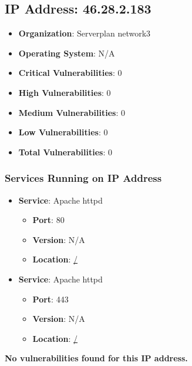 \documentclass{article}
\begin{document}
\clearpage



\subsection{IP Address: 46.28.2.183}

\begin{itemize}
    \item \textbf{Organization}: Serverplan network3
    \item \textbf{Operating System}:  N/A 
    \item \textbf{Critical Vulnerabilities}: 0
    \item \textbf{High Vulnerabilities}: 0
    \item \textbf{Medium Vulnerabilities}: 0
    \item \textbf{Low Vulnerabilities}: 0
    \item \textbf{Total Vulnerabilities}: 0
\end{itemize}

\subsubsection*{Services Running on IP Address}

\begin{itemize}
    
        \item \textbf{Service}: Apache httpd
        \begin{itemize}
            \item \textbf{Port}: 80
            \item \textbf{Version}:  N/A 
            \item \textbf{Location}: \href{ / }{ / }
        \end{itemize}
    
        \item \textbf{Service}: Apache httpd
        \begin{itemize}
            \item \textbf{Port}: 443
            \item \textbf{Version}:  N/A 
            \item \textbf{Location}: \href{ / }{ / }
        \end{itemize}
    
\end{itemize}


\textbf{No vulnerabilities found for this IP address.}
\end{document}
